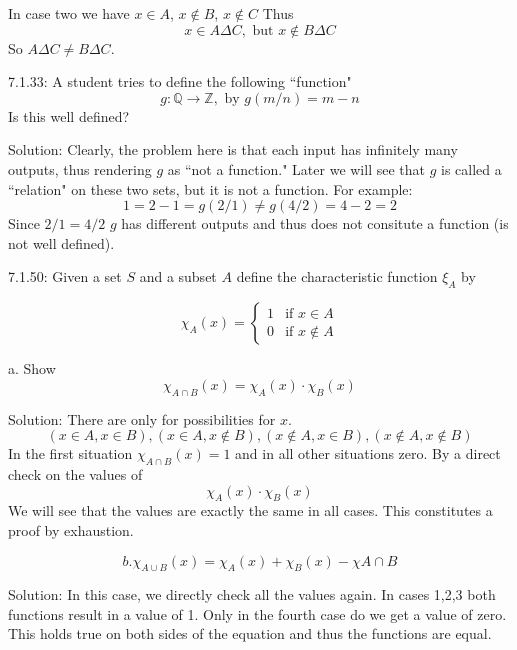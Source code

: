 \documentclass[16 pt]{amsart}
\theoremstyle{definition}
\theoremstyle{remark}
\numberwithin{equation}{subsection}
\newcommand{\Z}{\mathbb{Z}}
\newcommand{\Q}{\mathbb{Q}}
\begin{document}
In case two we have $x\in A$, $x\notin B$, $x\notin C$
Thus
\[
x\in A\Delta C, \text{ but } x\notin B\Delta C
\]
So $A\Delta C \neq B\Delta C$.

\newpage

7.1.33: A student tries to define the following ``function"
\[
g: \Q \rightarrow \Z, \text{ by } g(m/n) = m-n
\]
Is this well defined?

\vspace{1in}

Solution:  Clearly, the problem here is that each input has infinitely many outputs, thus rendering $g$ as ``not a function."  Later we will see that $g$ is called a ``relation" on these two sets, but it is not a function.  For example:
\[
1 = 2-1 = g(2/1) \neq g(4/2) = 4-2 = 2
\]
Since $2/1 = 4/2$ $g$ has different outputs and thus does not consitute a function (is not well defined).

\newpage

7.1.50: Given a set $S$ and a subset $A$ define the characteristic function $\xi_A$ by

\[\chi_A (x) = \left\{\begin{array}{ll}
1 & \text{if } x\in A\\
0 & \text{if } x\notin A
\end{array} \right.
\]

a. Show
\[
\chi_{A\cap B} (x) = \chi_A(x) \cdot \chi_B(x)
\]

\vspace{.5in}

Solution: There are only for possibilities for $x$.  
\[
(x\in A, x\in B), (x\in A, x\notin B), (x\notin A, x\in B), (x\notin A, x\notin B)
\]
In the first situation $\chi_{A\cap B} (x) = 1$ and in all other situations zero.  By a direct check on the values of 
\[
\chi_A(x)\cdot \chi_B(x)
\]
We will see that the values are exactly the same in all cases.  This constitutes a proof by exhaustion.

\vspace{.5in}

\[
b.\chi_{A\cup B} (x) = \chi_A(x) + \chi_B(x) - \chi{A\cap B}
\]

\vspace{.5in}

Solution: In this case, we directly check all the values again.
In cases 1,2,3 both functions result in a value of 1.  Only in the fourth case do we get a value of zero.  This holds true on both sides of the equation and thus the functions are equal.
\end{document}
